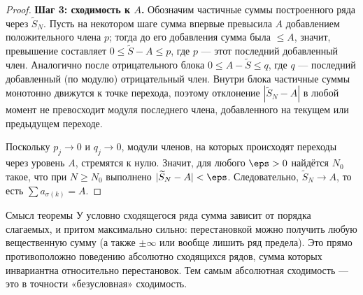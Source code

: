 \begin{proof}
	\textbf{Шаг 3: сходимость к $A$.} Обозначим частичные суммы построенного
	ряда через $\widetilde S_N$. Пусть на некотором шаге сумма впервые
	превысила $A$ добавлением положительного члена $p$; тогда до его добавления
	сумма была $\le A$, значит, превышение составляет $0\le\widetilde S-A\le p$,
	где $p$ --- этот последний добавленный член. Аналогично после
	отрицательного блока $0\le A-\widetilde S\le q$, где $q$ --- последний
	добавленный (по модулю) отрицательный член. Внутри блока частичные суммы
	монотонно движутся к точке перехода, поэтому отклонение $|\widetilde S_N-A|$
	в любой момент не превосходит модуля последнего члена, добавленного на
	текущем или предыдущем переходе.

	Поскольку $p_j\to0$ и $q_j\to0$, модули членов, на которых происходят
	переходы через уровень $A$, стремятся к нулю. Значит, для любого $\eps>0$
	найдётся $N_0$ такое, что при $N\ge N_0$ выполнено $|\widetilde S_N-A|<\eps$.
	Следовательно, $\widetilde S_N\to A$, то есть $\sum a_{\sigma(k)}=A$.
\end{proof}

\begin{Remark}{Смысл теоремы}{}
	У условно сходящегося ряда сумма зависит от порядка слагаемых, и притом
	максимально сильно: перестановкой можно получить любую вещественную сумму
	(а также $\pm\infty$ или вообще лишить ряд предела). Это прямо
	противоположно поведению абсолютно сходящихся рядов, сумма которых
	инвариантна относительно перестановок. Тем самым абсолютная сходимость ---
	это в точности «безусловная» сходимость.
\end{Remark}
